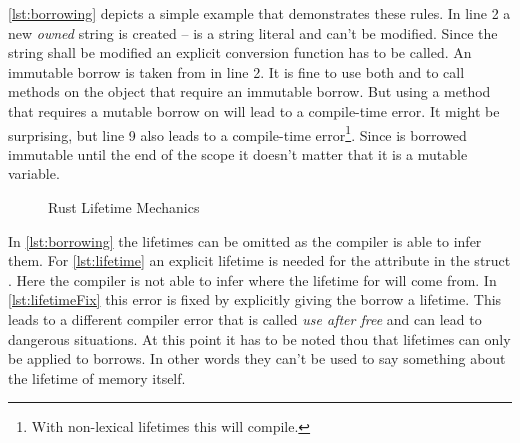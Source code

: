 \documentclass[thesis]{subfiles}
\begin{document}
    

    \autoref{lst:borrowing} depicts a simple example that demonstrates these rules.
    In line 2 a new \emph{owned} string is created --  is a string literal and can't be modified.
    Since the string shall be modified an explicit conversion function has to be called.
    An immutable borrow is taken from  in line 2.
    It is fine to use both  and  to call methods on the object that require an immutable borrow.
    But using a method that requires a mutable borrow on  will lead to a compile-time error.
    It might be surprising, but line 9 also leads to a compile-time error\footnote{%
      With non-lexical lifetimes this will compile.
    }.
    Since  is borrowed immutable until the end of the scope it doesn't matter that it is a mutable variable.

    \newsavebox{\lifetimeErrBox}
    \begin{lrbox}{\lifetimeErrBox}%
      \begin{minipage}{.45\linewidth}
        
      \end{minipage}
    \end{lrbox}

    \newsavebox{\lifetimeFixBox}
    \begin{lrbox}{\lifetimeFixBox}%
      \begin{minipage}{.45\linewidth}
        
      \end{minipage}
    \end{lrbox}

    \begin{figure}[ht]
      \captionsetup{type=lstlisting}
       \hfill%
      \caption{Rust Lifetime Mechanics}\label{lst:lifetime}
    \end{figure}

    In \autoref{lst:borrowing} the lifetimes can be omitted as the compiler is able to infer them.
    For \autoref{lst:lifetime} an explicit lifetime is needed for the attribute  in the struct .
    Here the compiler is not able to infer where the lifetime for  will come from.
    In \autoref{lst:lifetimeFix} this error is fixed by explicitly giving the borrow a lifetime.
    This leads to a different compiler error that is called \emph{use after free} and can lead to dangerous situations.
    At this point it has to be noted thou that lifetimes can only be applied to borrows.
    In other words they can't be used to say something about the lifetime of memory itself.
\end{document}
